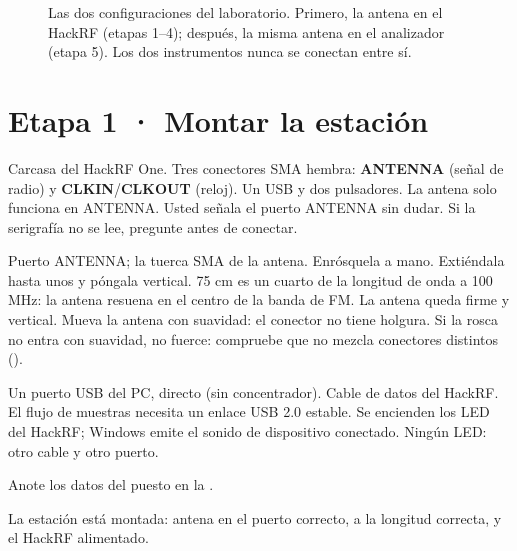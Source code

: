 \begin{figure}[H]
\centering
\resizebox{\linewidth}{!}{}
\caption{Las dos configuraciones del laboratorio. Primero, la antena en el HackRF (etapas 1--4); después, la misma antena en el analizador (etapa 5). Los dos instrumentos nunca se conectan entre sí.}
\label{fig:cadenafm}
\end{figure}

\section{Etapa 1 · Montar la estación}
\label{sec:w-equipo}


{Carcasa del HackRF One.}
{Tres conectores SMA hembra: \textbf{ANTENNA} (señal de radio) y \textbf{CLKIN}/\textbf{CLKOUT} (reloj). Un USB y dos pulsadores.}
{La antena solo funciona en ANTENNA.}
{Usted señala el puerto ANTENNA sin dudar.}
{}
{Si la serigrafía no se lee, pregunte antes de conectar.}

{Puerto ANTENNA; la tuerca SMA de la antena.}
{Enrósquela a mano. Extiéndala hasta unos \valor{75 cm} y póngala vertical.}
{75 cm es un cuarto de la longitud de onda a 100 MHz: la antena resuena en el centro de la banda de FM.}
{La antena queda firme y vertical.}
{Mueva la antena con suavidad: el conector no tiene holgura.}
{Si la rosca no entra con suavidad, no fuerce: compruebe que no mezcla conectores distintos ().}

{Un puerto USB del PC, directo (sin concentrador).}
{Cable de datos del HackRF.}
{El flujo de muestras necesita un enlace USB 2.0 estable.}
{Se encienden los LED del HackRF; Windows emite el sonido de dispositivo conectado.}
{}
{Ningún LED: otro cable y otro puerto.}

Anote los datos del puesto en la .

\begin{logro}
La estación está montada: antena en el puerto correcto, a la longitud correcta, y el HackRF alimentado.
\end{logro}

